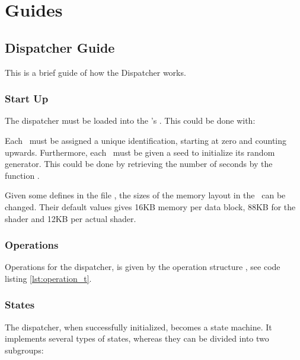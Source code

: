\chapter{Guides}

\section{Dispatcher Guide}

This is a brief guide of how the Dispatcher works.

\subsection{Start Up}

The dispatcher must be loaded into the \SPE{}'s \LS{}. This could be
done with:


Each \SPE\ must be assigned a unique identification, starting at zero
and counting upwards. Furthermore, each \SPE\ must be given a seed to
initialize its random generator. This could be done by retrieving the
number of seconds by the function .

Given some defines in the file , the sizes of the
memory layout in the \LS\ can be changed. Their default values gives
16KB memory per data block, 88KB for the shader and 12KB per actual
shader.


\subsection{Operations}

Operations for the dispatcher, is given by the operation structure
, see code listing \ref{lst:operation_t}.


\subsection{States}

The dispatcher, when successfully initialized, becomes a state
machine. It implements several types of states, whereas they can be
divided into two subgroups:


